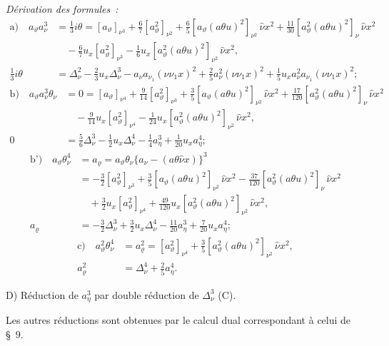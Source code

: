 \documentclass[11pt]{article}
\newcommand{\A}{\Delta}
\newcommand{\R}{\varrho}
\begin{document}
\noindent\emph{Dérivation des formules :}
\[
\begin{aligned}
\text{a)}\quad
a_\vartheta a_\nu^3
&=\frac13 i\theta
=[a_\vartheta]_{\nu^3}+\frac67[a_\vartheta^2]_{\nu^2}
+\frac65[a_\vartheta(a\theta u)^2]_{\nu^2}\,
\widehat{\nu}x^2
+\frac{11}{30}[a_\vartheta^2(a\theta u)^2]_\nu\,\widehat{\nu}x^2\\
&\quad-\frac67u_x[a_\vartheta^2]_{\nu^3}
-\frac16u_x[a_\vartheta^2(a\theta u)^2]_{\nu^2}\,\widehat{\nu}x^2,\\
\frac13 i\theta
&=\A_\nu^2-\frac23u_x\A_\nu^3-a_\nu a_{\nu_1}(\nu\nu_1x)^2
+\frac25a_\nu^2(\nu\nu_1x)^2
+\frac15u_xa_\nu^2a_{\nu_1}(\nu\nu_1x)^2;
\end{aligned}
\]
\[
\begin{aligned}
\text{b)}\quad
a_\vartheta a_\nu^3\theta_\nu
&=0=[a_\vartheta]_{\nu^4}+\frac9{14}[a_\vartheta^2]_{\nu^3}
+\frac35[a_\vartheta(a\theta u)^2]_{\nu^2}\,\widehat{\nu}x^2
+\frac{17}{120}[a_\vartheta^2(a\theta u)^2]_{\nu}\,\widehat{\nu}x^2\\
&\quad-\frac9{14}u_x[a_\vartheta^2]_{\nu^4}
-\frac1{24}u_x[a_\vartheta^2(a\theta u)^2]_{\nu^2}\,\widehat{\nu}x^2,\\
0&=\frac56\A_\nu^3-\frac12u_x\A_\nu^4-\frac14a_\eta^3+\frac1{20}u_xa_\eta^4;
\end{aligned}
\]
\[
\begin{aligned}
\text{b')}\quad
a_\vartheta\theta_\nu^4
&=a_\R=a_\vartheta\theta_\nu\{a_\nu-(a\theta\widehat{\nu}x)\}^3\\
&=-\frac32[a_\vartheta^2]_{\nu^3}+\frac35[a_\vartheta(a\theta u)^2]_{\nu^2}\,\widehat{\nu}x^2
-\frac{37}{120}[a_\vartheta^2(a\theta u)^2]_{\nu}\,\widehat{\nu}x^2\\
&\quad+\frac32u_x[a_\vartheta^2]_{\nu^4}
+\frac{49}{120}u_x[a_\vartheta^2(a\theta u)^2]_{\nu^2}\,\widehat{\nu}x^2,\\
a_\R&=-\frac32\A_\nu^3+\frac32u_x\A_\nu^4-\frac{11}{20}a_\eta^3+\frac7{20}u_xa_\eta^4;
\end{aligned}
\]
\[
\begin{aligned}
\text{c)}\quad
a_\vartheta^2\theta_\nu^4
&=a_\R^2=[a_\vartheta^2]_{\nu^4}+\frac35[a_\vartheta^2(a\theta u)^2]_{\nu^2}\,\widehat{\nu}x^2,\\
a_\R^2&=\A_\nu^4+\frac25a_\eta^4.
\end{aligned}
\]

\noindent D) Réduction de $a_\eta^3$ par double réduction de $\A_\nu^3$ (C).

Les autres réductions sont obtenues par le calcul dual correspondant à celui de \S\ 9.
\end{document}
